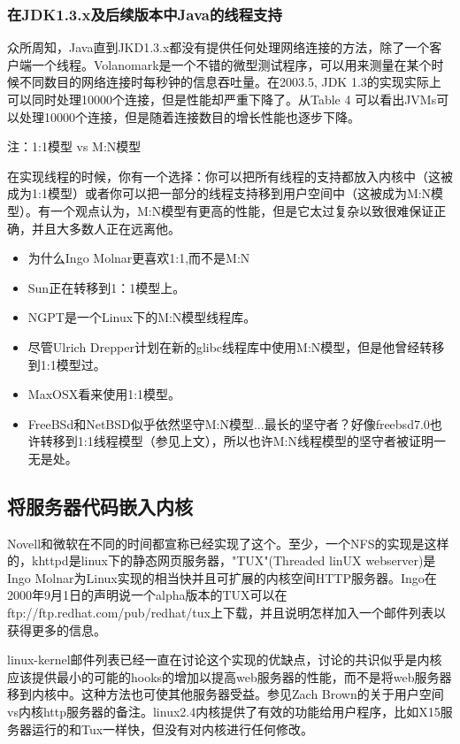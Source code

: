 \documentclass[twoside, xetex]{report}
\begin{document}
\subsubsection*{在JDK1.3.x及后续版本中Java的线程支持}

	众所周知，Java直到JKD1.3.x都没有提供任何处理网络连接的方法，除了一个客户端一个线程。Volanomark是一个不错的微型测试程序，可以用来测量在某个时候不同数目的网络连接时每秒钟的信息吞吐量。在2003.5, JDK 1.3的实现实际上可以同时处理10000个连接，但是性能却严重下降了。从Table 4 可以看出JVMs可以处理10000个连接，但是随着连接数目的增长性能也逐步下降。

	注：1:1模型 vs M:N模型

	在实现线程的时候，你有一个选择：你可以把所有线程的支持都放入内核中（这被成为1:1模型）或者你可以把一部分的线程支持移到用户空间中（这被成为M:N模型）。有一个观点认为，M:N模型有更高的性能，但是它太过复杂以致很难保证正确，并且大多数人正在远离他。
	\begin{itemize}
		\item 为什么Ingo Molnar更喜欢1:1,而不是M:N
		\item Sun正在转移到1：1模型上。
		\item NGPT是一个Linux下的M:N模型线程库。
		\item 尽管Ulrich Drepper计划在新的glibc线程库中使用M:N模型，但是他曾经转移到1:1模型过。
		\item MaxOSX看来使用1:1模型。
		\item FreeBSd和NetBSD似乎依然坚守M:N模型...最长的坚守者？好像freebsd7.0也许转移到1:1线程模型（参见上文），所以也许M:N线程模型的坚守者被证明一无是处。
	\end{itemize}
\subsection*{将服务器代码嵌入内核}

	Novell和微软在不同的时间都宣称已经实现了这个。至少，一个NFS的实现是这样的，khttpd是linux下的静态网页服务器，"TUX"(Threaded linUX webserver)是Ingo Molnar为Linux实现的相当快并且可扩展的内核空间HTTP服务器。Ingo在2000年9月1日的声明说一个alpha版本的TUX可以在ftp://ftp.redhat.com/pub/redhat/tux上下载，并且说明怎样加入一个邮件列表以获得更多的信息。

	linux-kernel邮件列表已经一直在讨论这个实现的优缺点，讨论的共识似乎是内核应该提供最小的可能的hooks的增加以提高web服务器的性能，而不是将web服务器移到内核中。这种方法也可使其他服务器受益。参见Zach Brown的关于用户空间vs内核http服务器的备注。linux2.4内核提供了有效的功能给用户程序，比如X15服务器运行的和Tux一样快，但没有对内核进行任何修改。
	
\end{document}
